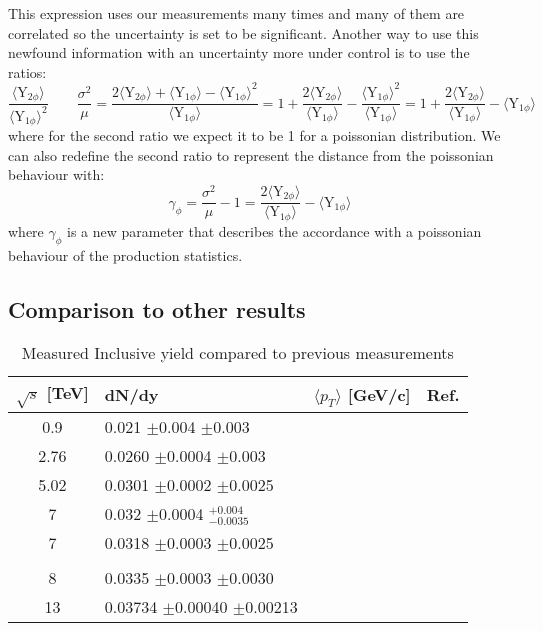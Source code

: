 This expression uses our measurements many times and many of them are correlated so the uncertainty is set to be significant. Another way to use this newfound information with an uncertainty more under control is to use the ratios:
\begin{equation}
\frac{\langle \text{Y}_{2\phi} \rangle} {\langle \text{Y}_{1\phi} \rangle^2}\qquad \frac{\sigma^2}{\mu} = \frac{2\langle \text{Y}_{2\phi} \rangle + \langle \text{Y}_{1\phi} \rangle - \langle \text{Y}_{1\phi} \rangle^2}{\langle \text{Y}_{1\phi} \rangle} = 1 + \frac{2\langle \text{Y}_{2\phi} \rangle}{\langle \text{Y}_{1\phi} \rangle} - \frac{ \langle \text{Y}_{1\phi} \rangle^2}{\langle \text{Y}_{1\phi} \rangle} = 1 + \frac{2\langle \text{Y}_{2\phi} \rangle}{\langle \text{Y}_{1\phi} \rangle} - \langle \text{Y}_{1\phi} \rangle
\label{eq:}
\end{equation}
where for the second ratio we expect it to be 1 for a poissonian distribution. We can also redefine the second ratio to represent the distance from the poissonian behaviour with:
 \begin{equation}
\gamma_{\phi} =  \frac{\sigma^2}{\mu} - 1 = \frac{2\langle \text{Y}_{2\phi} \rangle}{\langle \text{Y}_{1\phi} \rangle} - \langle \text{Y}_{1\phi} \rangle
\label{eq:}
\end{equation}
where $\gamma_\phi$ is a new parameter that describes the accordance with a poissonian behaviour of the production statistics. 

\subsection{Comparison to other results}

\begin{table}
\centering
\begin{tabular}{c | l | l | c}
$\sqrt{s}$ [TeV]		&dN/dy									&$\langle p_{T}\rangle$ [GeV/c]		&Ref.\\
\hline
\hline
0.9				&0.021	$\pm$0.004	$\pm$0.003			&								&\cite{phi_0.9}\\
\hline
2.76				&0.0260	$\pm$0.0004	$\pm$0.003			&								&\cite{phi_2.76}\\
\hline
5.02				&0.0301	$\pm$0.0002	$\pm$0.0025			&								&\cite{phi_5.02}\\
\hline
7				&0.032	$\pm$0.0004	$^{+0.004}_{-0.0035}$	&								&\cite{PrevPub}\\
7				&0.0318	$\pm$0.0003	$\pm$0.0025			&								&\cite{phi_8}\\
\color{red}{7}		&\color{red}{0.03290 $\pm$0.00017	$\pm$0.0015}	&								&\color{red}{This work}\\
\hline
8				&0.0335	$\pm$0.0003	$\pm$0.0030			&								&\cite{phi_8}\\
\hline
13				&0.03734	$\pm$0.00040	$\pm$0.00213			&								&\cite{phi_13}\\
\hline
\end{tabular}
\caption{Measured Inclusive yield compared to previous measurements}
\label{22}
\end{table}

